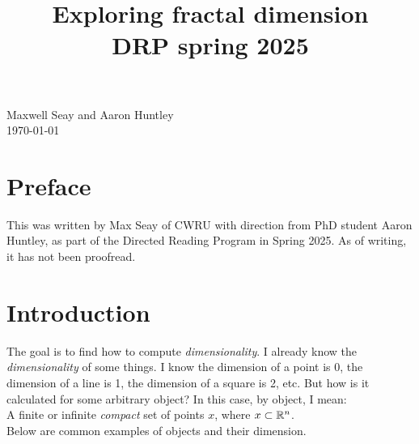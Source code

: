 \documentclass[11pt]{ekblite}
\begin{document}
\title{Exploring fractal dimension\\
DRP spring 2025}
\maketitle
\begin{center}
Maxwell Seay and Aaron Huntley\\
\today
\end{center}

\tableofcontents

\newpage

\section{Preface}
This was written by Max Seay of CWRU with direction from PhD student Aaron Huntley, as part of the Directed Reading Program in Spring 2025. As of writing, it has not been proofread.

\newpage
\section{Introduction}
The goal is to find how to compute \textit{dimensionality}. I already know the \textit{dimensionality} of some things. I know the dimension of a point is 0, the dimension of a line is 1, the dimension of a square is 2, etc. But how is it calculated for some arbitrary object? In this case, by object, I mean:
\\[0.2in]A finite or infinite \textit{compact} set of points $x$, where $x \subset \mathbb{R}^n$.
\\[0.2in]Below are common examples of objects and their dimension.

\newpage
\end{document}
